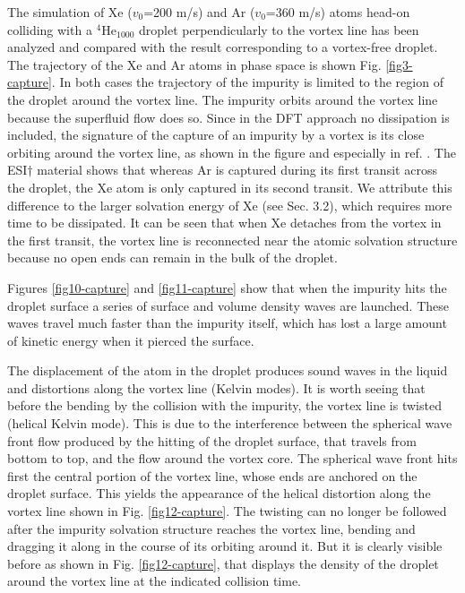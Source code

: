 The simulation of Xe ($v_0$=200 m/s) and Ar ($v_0$=360 m/s) atoms head-on colliding with a $^4$He$_{1000}$ droplet perpendicularly to the vortex line has been analyzed and
compared with the result corresponding to a vortex-free droplet. The trajectory of the Xe and Ar atoms in phase space is shown Fig. \ref{fig3-capture}. In both cases the trajectory of the impurity
is limited to the region of the droplet around the vortex line. The impurity orbits around the vortex line because the superfluid flow does so. Since in the DFT approach
no dissipation is included, the signature of the capture of an impurity by a vortex is its close orbiting around the vortex line, as shown in the figure
and especially  in ref. \citep{ESI}. The ESI$\dag$ material shows that whereas Ar is captured during its first transit across the droplet, the Xe atom is only captured in its second transit. We attribute this difference 
to the larger solvation energy of Xe (see Sec. 3.2), which requires more time to be dissipated. It can be seen\citep{ESI} that when Xe detaches from the vortex  in the first
transit,   the  vortex line is reconnected near the atomic solvation structure because no open ends can remain in the bulk of the droplet.
  
Figures \ref{fig10-capture} and \ref{fig11-capture} show that
 when the impurity hits the droplet surface a series of surface and volume density waves are launched.
These waves travel  much faster than the impurity itself, 
which has lost a large amount of kinetic energy when it pierced the surface.

The displacement of the  atom in the droplet
produces sound waves in the liquid and distortions along the vortex line (Kelvin modes). 
It is worth seeing that before the bending by the collision with the impurity, the vortex line is twisted (helical Kelvin mode). 
  This  is due to the interference between the  spherical wave front flow
 produced by the hitting of the droplet surface, that travels from bottom to top, 
 and the  flow around the vortex core.
 The spherical wave front  hits first the central portion of the vortex line, whose ends are anchored on the droplet surface. This yields the appearance of the helical distortion
 along the vortex line shown in Fig. \ref{fig12-capture}.
 The twisting  can no longer  be followed after the
 impurity solvation structure reaches the vortex line, bending and dragging it along in the course of its orbiting around it. But it is clearly visible before as shown in Fig. \ref{fig12-capture}, that displays the
 density of the droplet around the vortex line at the indicated collision time. 

